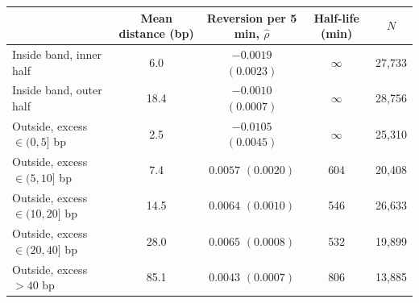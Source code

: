 \begin{tabular}{lcccc}
\toprule
 & Mean distance (bp) & Reversion per 5 min, $\hat\rho$ & Half-life (min) & $N$ \\
\midrule
Inside band, inner half & 6.0 & $-0.0019$ $(0.0023)$ & $\infty$ & 27,733 \\
Inside band, outer half & 18.4 & $-0.0010$ $(0.0007)$ & $\infty$ & 28,756 \\
Outside, excess $\in(0,5]$ bp & 2.5 & $-0.0105$ $(0.0045)$ & $\infty$ & 25,310 \\
Outside, excess $\in(5,10]$ bp & 7.4 & $0.0057$ $(0.0020)$ & 604 & 20,408 \\
Outside, excess $\in(10,20]$ bp & 14.5 & $0.0064$ $(0.0010)$ & 546 & 26,633 \\
Outside, excess $\in(20,40]$ bp & 28.0 & $0.0065$ $(0.0008)$ & 532 & 19,899 \\
Outside, excess $>40$ bp & 85.1 & $0.0043$ $(0.0007)$ & 806 & 13,885 \\
\bottomrule
\end{tabular}
